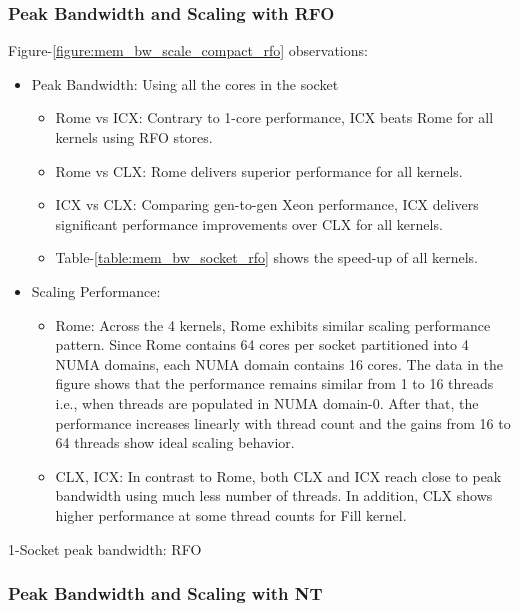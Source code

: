 \documentclass{article}
\begin{document}
\subsubsection{Peak Bandwidth and Scaling with RFO}
Figure-\ref{figure:mem_bw_scale_compact_rfo} observations:
\begin{itemize}
\item Peak Bandwidth: Using all the cores in the socket
\begin{itemize}
\item Rome vs ICX: Contrary to 1-core performance, ICX beats Rome for all kernels using RFO stores.
\item Rome vs CLX: Rome delivers superior performance for all kernels.
\item ICX vs CLX: Comparing gen-to-gen Xeon performance, ICX delivers significant performance improvements over CLX for all kernels.
\item Table-\ref{table:mem_bw_socket_rfo} shows the speed-up of all kernels.
\end{itemize}
\item Scaling Performance: 
\begin{itemize}
\item Rome: Across the 4 kernels, Rome exhibits similar scaling performance pattern. Since Rome contains 64 cores per socket partitioned into 4 NUMA domains, each NUMA domain contains 16 cores. The data in the figure shows that the performance remains similar from 1 to 16 threads i.e., when threads are populated in NUMA domain-0. After that, the performance increases linearly with thread count and the gains from 16 to 64 threads show ideal scaling behavior.
\item CLX, ICX: In contrast to Rome, both CLX and ICX reach close to peak bandwidth using much less number of threads. In addition, CLX shows higher performance at some thread counts for Fill kernel.
\end{itemize}
\end{itemize}

\begin{table}[h!]
\centering

\caption{1-Socket peak bandwidth: RFO}
\label{table:mem_bw_socket_rfo}
\end{table}

\subsubsection{Peak Bandwidth and Scaling with NT}
\end{document}
